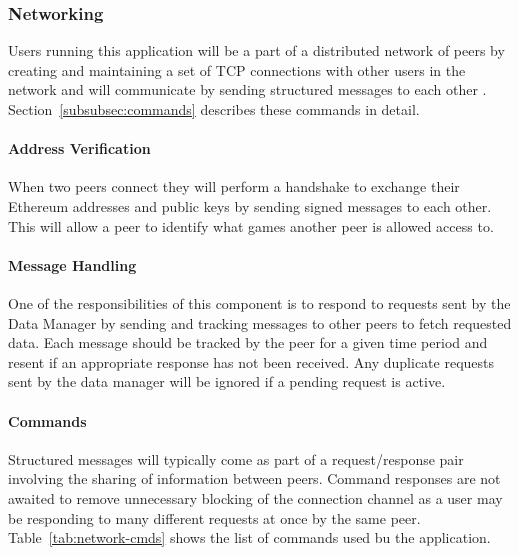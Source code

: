 \subsubsection*{Networking}

Users running this application will be a part of a distributed network of peers by creating and maintaining a set of TCP connections with other users  in the network and will communicate by sending structured messages to each other . Section~\ref{subsubsec:commands} describes these commands in detail.

\paragraph*{Address Verification}
When two peers connect they will perform a handshake to exchange their Ethereum addresses and public keys by sending signed messages to each other. This will allow a peer to identify what games another peer is allowed access to.

\paragraph*{Message Handling}

One of the responsibilities of this component is to respond to requests sent by the Data Manager by sending and tracking messages to other peers to fetch requested data. Each message should be tracked by the peer for a given time period and resent if an appropriate response has not been received. Any duplicate requests sent by the data manager will be ignored if a pending request is active. 

\paragraph*{Commands}\label{subsubsec:commands}

Structured messages  will typically come as part of a request/response pair involving the sharing of information between peers. Command responses are not awaited to remove unnecessary blocking of the connection channel as a user may be responding to many different requests at once by the same peer. Table~\ref{tab:network-cmds} shows the list of commands used bu the application.

